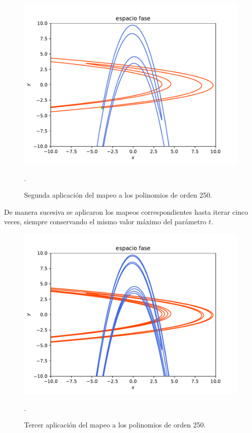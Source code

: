 \begin{figure}[H]
\centering
\includegraphics[scale=0.5]{rectangulo2}
\caption{Segunda aplicación del mapeo a los polinomios de orden 250.}.
\label{Rectangulo2}
\end{figure}

De manera sucesiva se aplicaron los mapeos correspondientes hasta iterar cinco veces, siempre conservando el mismo valor máximo del parámetro $t$.
\begin{figure}[H]
\centering
\includegraphics[scale=0.5]{rectangulo3}
\caption{Tercer aplicación del mapeo a los polinomios de orden 250.}.
\label{Rectangulo3}
\end{figure}


